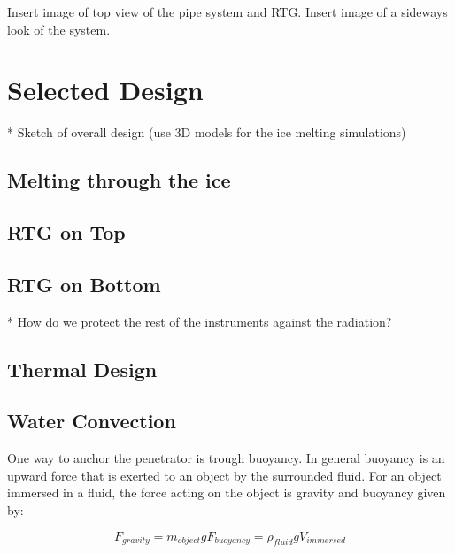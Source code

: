 Insert image of top view of the pipe system and RTG. 
Insert image of a sideways look of the system.


\section{Selected Design}

* Sketch of overall design (use 3D models for the ice melting simulations)

\subsection{Melting through the ice} %

\subsection{RTG on Top}

\subsection{RTG on Bottom}

* How do we protect the rest of the instruments against the radiation?





\subsection{Thermal Design}

\subsection{Water Convection}



One way to anchor the penetrator is trough buoyancy. In general buoyancy is an upward force that is exerted to an object by the surrounded fluid. For an object immersed in a fluid, the force acting on the object is gravity and buoyancy given by:

\begin{subequations}
\begin{equation}\label{eq:bouyancy1}
F_{gravity} = m_{object}g
\end{equation}
\begin{equation} \label{eq:bouyancy2}
F_{buoyancy} = \rho_{fluid}g V_{immersed} 
\end{equation}
\end{subequations}

